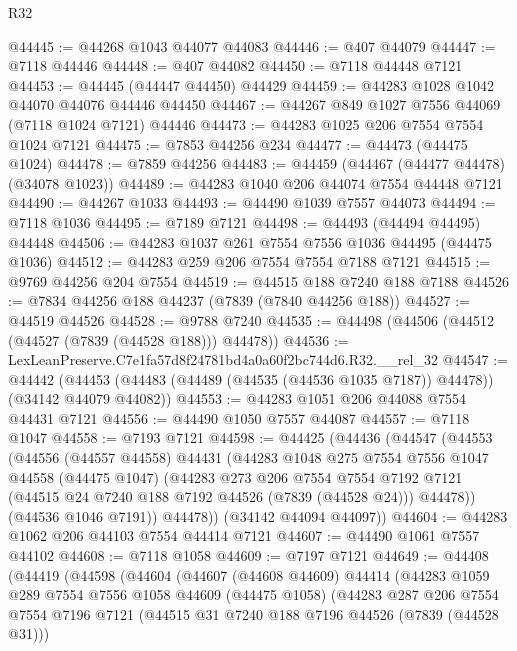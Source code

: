 \begin{lexlean}{R32}
\begin{coremodule}
@44445 := @44268 @1043 @44077 @44083
@44446 := @407 @44079
@44447 := @7118 @44446
@44448 := @407 @44082
@44450 := @7118 @44448 @7121
@44453 := @44445 (@44447 @44450) @44429
@44459 := @44283 @1028 @1042 @44070 @44076 @44446 @44450
@44467 := @44267 @849 @1027 @7556 @44069 (@7118 @1024 @7121) @44446
@44473 := @44283 @1025 @206 @7554 @7554 @1024 @7121
@44475 := @7853 @44256 @234
@44477 := @44473 (@44475 @1024)
@44478 := @7859 @44256
@44483 := @44459 (@44467 (@44477 @44478) (@34078 @1023))
@44489 := @44283 @1040 @206 @44074 @7554 @44448 @7121
@44490 := @44267 @1033
@44493 := @44490 @1039 @7557 @44073
@44494 := @7118 @1036
@44495 := @7189 @7121
@44498 := @44493 (@44494 @44495) @44448
@44506 := @44283 @1037 @261 @7554 @7556 @1036 @44495 (@44475 @1036)
@44512 := @44283 @259 @206 @7554 @7554 @7188 @7121
@44515 := @9769 @44256 @204 @7554
@44519 := @44515 @188 @7240 @188 @7188
@44526 := @7834 @44256 @188 @44237 (@7839 (@7840 @44256 @188))
@44527 := @44519 @44526
@44528 := @9788 @7240
@44535 := @44498 (@44506 (@44512 (@44527 (@7839 (@44528 @188))) @44478))
@44536 := LexLeanPreserve.C7e1fa57d8f24781bd4a0a60f2bc744d6.R32.__rel_32
@44547 := @44442
    (@44453 (@44483 (@44489 (@44535 (@44536 @1035 @7187)) @44478)) (@34142 @44079 @44082))
@44553 := @44283 @1051 @206 @44088 @7554 @44431 @7121
@44556 := @44490 @1050 @7557 @44087
@44557 := @7118 @1047
@44558 := @7193 @7121
@44598 := @44425
    (@44436
      (@44547
        (@44553
          (@44556
            (@44557 @44558)
            @44431
            (@44283
              @1048
              @275
              @7554
              @7556
              @1047
              @44558
              (@44475 @1047)
              (@44283
                @273
                @206
                @7554
                @7554
                @7192
                @7121
                (@44515 @24 @7240 @188 @7192 @44526 (@7839 (@44528 @24)))
                @44478))
            (@44536 @1046 @7191))
          @44478))
      (@34142 @44094 @44097))
@44604 := @44283 @1062 @206 @44103 @7554 @44414 @7121
@44607 := @44490 @1061 @7557 @44102
@44608 := @7118 @1058
@44609 := @7197 @7121
@44649 := @44408
    (@44419
      (@44598
        (@44604
          (@44607
            (@44608 @44609)
            @44414
            (@44283
              @1059
              @289
              @7554
              @7556
              @1058
              @44609
              (@44475 @1058)
              (@44283
                @287
                @206
                @7554
                @7554
                @7196
                @7121
                (@44515 @31 @7240 @188 @7196 @44526 (@7839 (@44528 @31)))

\end{coremodule}
\end{lexlean}
